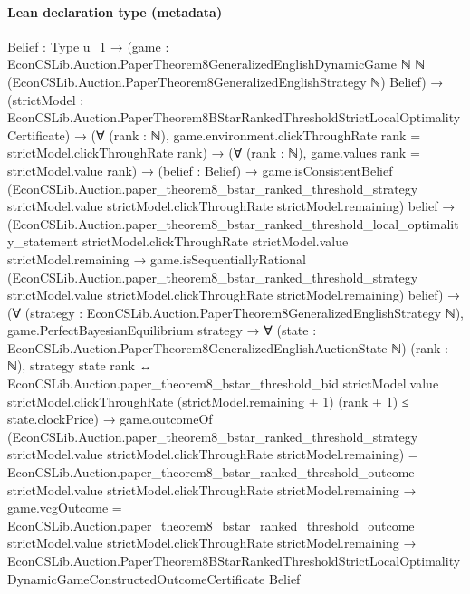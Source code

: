 \documentclass[10pt]{article}
\begin{document}
\paragraph{Lean declaration type (metadata)}
\begin{ReviewVerbatim}
{Belief : Type u_1} →
  (game :
      EconCSLib.Auction.PaperTheorem8GeneralizedEnglishDynamicGame ℕ ℕ
        (EconCSLib.Auction.PaperTheorem8GeneralizedEnglishStrategy ℕ) Belief) →
    (strictModel : EconCSLib.Auction.PaperTheorem8BStarRankedThresholdStrictLocalOptimalityCertificate) →
      (∀ (rank : ℕ), game.environment.clickThroughRate rank = strictModel.clickThroughRate rank) →
        (∀ (rank : ℕ), game.values rank = strictModel.value rank) →
          (belief : Belief) →
            game.isConsistentBelief
                (EconCSLib.Auction.paper_theorem8_bstar_ranked_threshold_strategy strictModel.value
                  strictModel.clickThroughRate strictModel.remaining)
                belief →
              (EconCSLib.Auction.paper_theorem8_bstar_ranked_threshold_local_optimality_statement
                    strictModel.clickThroughRate strictModel.value strictModel.remaining →
                  game.isSequentiallyRational
                    (EconCSLib.Auction.paper_theorem8_bstar_ranked_threshold_strategy strictModel.value
                      strictModel.clickThroughRate strictModel.remaining)
                    belief) →
                (∀ (strategy : EconCSLib.Auction.PaperTheorem8GeneralizedEnglishStrategy ℕ),
                    game.PerfectBayesianEquilibrium strategy →
                      ∀ (state : EconCSLib.Auction.PaperTheorem8GeneralizedEnglishAuctionState ℕ) (rank : ℕ),
                        strategy state rank ↔
                          EconCSLib.Auction.paper_theorem8_bstar_threshold_bid strictModel.value
                              strictModel.clickThroughRate (strictModel.remaining + 1) (rank + 1) ≤
                            state.clockPrice) →
                  game.outcomeOf
                        (EconCSLib.Auction.paper_theorem8_bstar_ranked_threshold_strategy strictModel.value
                          strictModel.clickThroughRate strictModel.remaining) =
                      EconCSLib.Auction.paper_theorem8_bstar_ranked_threshold_outcome strictModel.value
                        strictModel.clickThroughRate strictModel.remaining →
                    game.vcgOutcome =
                        EconCSLib.Auction.paper_theorem8_bstar_ranked_threshold_outcome strictModel.value
                          strictModel.clickThroughRate strictModel.remaining →
                      EconCSLib.Auction.PaperTheorem8BStarRankedThresholdStrictLocalOptimalityDynamicGameConstructedOutcomeCertificate
                        Belief
\end{ReviewVerbatim}
\end{document}
